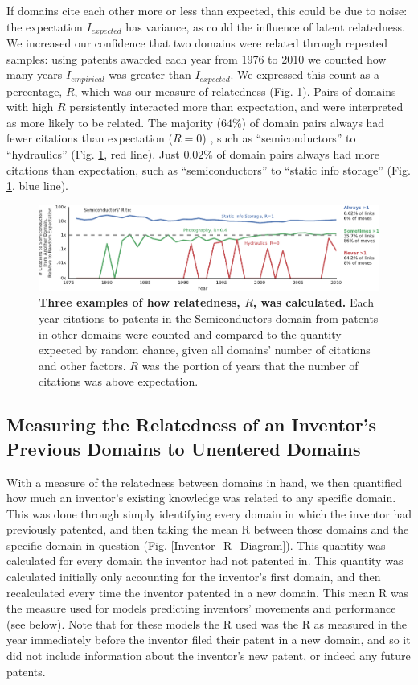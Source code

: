 \documentclass{dsj}
\begin{document}
If domains cite each other more or less than expected, this could be due to noise: the expectation $I_{expected}$ has variance, as could the influence of latent relatedness. We increased our confidence that two domains were related through repeated samples: using patents awarded each year from 1976 to 2010 we counted how many years $I_{empirical}$ was greater than $I_{expected}$. We expressed this count as a percentage, $R$, which was our measure of relatedness (Fig. \ref{R_definition}). Pairs of domains with high $R$ persistently interacted more than expectation, and were interpreted as more likely to be related. The majority (64\%) of domain pairs always had fewer citations than expectation ($R=0$)
, such as ``semiconductors'' to ``hydraulics'' (Fig. \ref{R_definition}, red line). Just $0.02\%$ of domain pairs always had more citations than expectation, such as ``semiconductors'' to ``static info storage'' (Fig. \ref{R_definition}, blue line). 

\begin{figure}
\includegraphics[width=1.3\textwidth]{figs/R_definition.pdf} 
\caption{\textbf{Three examples of how relatedness, $R$, was calculated.} Each year citations to patents in the Semiconductors domain from patents in other domains were counted and compared to the quantity expected by random chance, given all domains' number of citations and other factors. $R$ was the portion of years that the number of citations was above expectation. 
}\label{R_definition}
\end{figure}

\subsection*{Measuring the Relatedness of an Inventor’s Previous Domains to Unentered Domains}

With a measure of the relatedness between domains in hand, we then quantified how much an inventor’s existing knowledge was related to any specific domain. This was done through simply identifying every domain in which the inventor had previously patented, and then taking the mean R between those domains and the specific domain in question (Fig. \ref{Inventor_R_Diagram}). This quantity was calculated for every domain the inventor had not patented in. This quantity was calculated initially only accounting for the inventor’s first domain, and then recalculated every time the inventor patented in a new domain. This mean R was the measure used for models predicting inventors’ movements and performance (see below). Note that for these models the R used was the R as measured in the year immediately before the inventor filed their patent in a new domain, and so it did not include information about the inventor’s new patent, or indeed any future patents.
\end{document}
